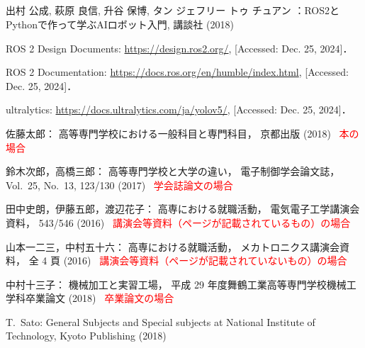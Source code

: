 \begin{center}
	\section*{}                      %
	\vspace*{-2zh}
\end{center}

\begin{thebibliography}{99}
	
	出村 公成, 萩原 良信, 升谷 保博, タン ジェフリー トゥ チュアン
	：ROS2とPythonで作って学ぶAIロボット入門, 
	講談社 (2018)
	
	ROS 2 Design Documents: \url{https://design.ros2.org/}, [Accessed: Dec. 25, 2024]．
	
	ROS 2 Documentation: \url{https://docs.ros.org/en/humble/index.html}, [Accessed: Dec. 25, 2024]．
	
	ultralytics: \url{https://docs.ultralytics.com/ja/yolov5/}, [Accessed: Dec. 25, 2024]．
	
	佐藤太郎：
	高等専門学校における一般科目と専門科目，
	京都出版 (2018)
	\textcolor{red}{\quad\cdotfill\ 本の場合}
	
	鈴木次郎，高橋三郎：
	高等専門学校と大学の違い，
	電子制御学会論文誌，
	Vol.~25, No.~13, 123/130 (2017)
	\textcolor{red}{\quad\cdotfill\ 学会誌論文の場合}
	
	田中史朗，伊藤五郎，渡辺花子：
	高専における就職活動，
	電気電子工学講演会資料，
	543/546 (2016)
	\textcolor{red}{\quad\cdotfill\ 講演会等資料（ページが記載されているもの）の場合}
	
	山本一二三，中村五十六：
	高専における就職活動，
	メカトロニクス講演会資料，
	全 4 頁 (2016)
	\textcolor{red}{\quad\cdotfill\ 講演会等資料（ページが記載されていないもの）の場合}
	
	中村十三子：
	機械加工と実習工場，
	平成 29 年度舞鶴工業高等専門学校機械工学科卒業論文 (2018)
	\textcolor{red}{\quad\cdotfill\ 卒業論文の場合}
	
	T.~Sato: 
	General Subjects and Special subjects at National Institute of Technology, 
	Kyoto Publishing (2018)
	

\end{thebibliography}
